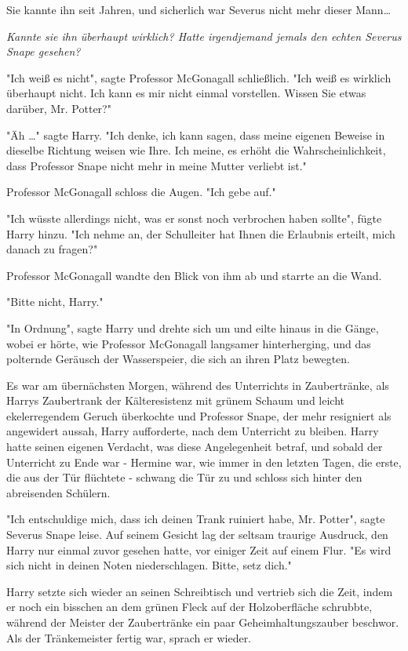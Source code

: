 {Sie kannte ihn seit Jahren, und sicherlich war Severus nicht mehr dieser Mann…

\emph{Kannte sie ihn überhaupt wirklich? Hatte irgendjemand jemals den echten Severus Snape gesehen?}

"Ich weiß es nicht", sagte Professor McGonagall schließlich. "Ich weiß es wirklich überhaupt nicht. Ich kann es mir nicht einmal vorstellen. Wissen Sie etwas darüber, Mr. Potter?"

"Äh …" sagte Harry. "Ich denke, ich kann sagen, dass meine eigenen Beweise in dieselbe Richtung weisen wie Ihre. Ich meine, es erhöht die Wahrscheinlichkeit, dass Professor Snape nicht mehr in meine Mutter verliebt ist."

Professor McGonagall schloss die Augen. "Ich gebe auf."

"Ich wüsste allerdings nicht, was er sonst noch verbrochen haben sollte", fügte Harry hinzu. "Ich nehme an, der Schulleiter hat Ihnen die Erlaubnis erteilt, mich danach zu fragen?"

Professor McGonagall wandte den Blick von ihm ab und starrte an die Wand.

"Bitte nicht, Harry."

"In Ordnung", sagte Harry und drehte sich um und eilte hinaus in die Gänge, wobei er hörte, wie Professor McGonagall langsamer hinterherging, und das polternde Geräusch der Wasserspeier, die sich an ihren Platz bewegten.

Es war am übernächsten Morgen, während des Unterrichts in Zaubertränke, als Harrys Zaubertrank der Kälteresistenz mit grünem Schaum und leicht ekelerregendem Geruch überkochte und Professor Snape, der mehr resigniert als angewidert aussah, Harry aufforderte, nach dem Unterricht zu bleiben. Harry hatte seinen eigenen Verdacht, was diese Angelegenheit betraf, und sobald der Unterricht zu Ende war - Hermine war, wie immer in den letzten Tagen, die erste, die aus der Tür flüchtete - schwang die Tür zu und schloss sich hinter den abreisenden Schülern.

"Ich entschuldige mich, dass ich deinen Trank ruiniert habe, Mr. Potter", sagte Severus Snape leise. Auf seinem Gesicht lag der seltsam traurige Ausdruck, den Harry nur einmal zuvor gesehen hatte, vor einiger Zeit auf einem Flur. "Es wird sich nicht in deinen Noten niederschlagen. Bitte, setz dich."

Harry setzte sich wieder an seinen Schreibtisch und vertrieb sich die Zeit, indem er noch ein bisschen an dem grünen Fleck auf der Holzoberfläche schrubbte, während der Meister der Zaubertränke ein paar Geheimhaltungszauber beschwor. Als der Tränkemeister fertig war, sprach er wieder.

}

